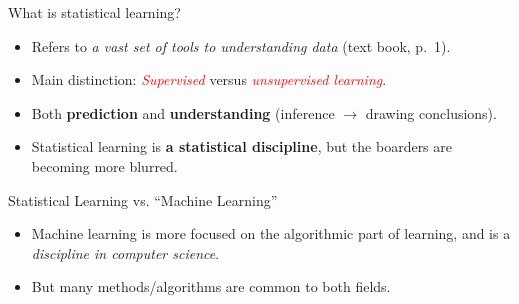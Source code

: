 \documentclass[10pt,ignorenonframetext,]{beamer}
\providecommand{\tightlist}{%
  \setlength{\itemsep}{0pt}\setlength{\parskip}{0pt}}
\begin{document}
\begin{frame}{What is statistical learning?}
\protect\hypertarget{what-is-statistical-learning}{}

\begin{itemize}
\tightlist
\item
  Refers to \emph{a vast set of tools to understanding data} (text book,
  p.~1).
\end{itemize}

\vspace{1mm}

\begin{itemize}
\tightlist
\item
  Main distinction: \emph{\textcolor{red}{Supervised}} versus
  \emph{\textcolor{red}{unsupervised learning}}.
\end{itemize}

\vspace{1mm}

\begin{itemize}
\tightlist
\item
  Both \textbf{prediction} and \textbf{understanding} (inference
  \(\rightarrow\) drawing conclusions).
\end{itemize}

\vspace{1mm}

\begin{itemize}
\tightlist
\item
  Statistical learning is \textbf{a statistical discipline}, but the
  boarders are becoming more blurred.
\end{itemize}

\end{frame}

\begin{frame}{Statistical Learning vs. ``Machine Learning''}
\protect\hypertarget{statistical-learning-vs.-machine-learning}{}

\vspace{2mm}

\begin{itemize}
\tightlist
\item
  Machine learning is more focused on the algorithmic part of learning,
  and is a \emph{discipline in computer science}.
\end{itemize}

\vspace{2mm}

\begin{itemize}
\tightlist
\item
  But many methods/algorithms are common to both fields.
\end{itemize}

\end{frame}
\end{document}
